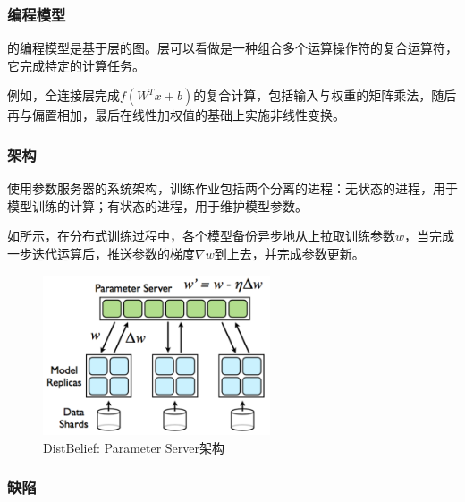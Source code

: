 \subsubsection{编程模型}

\begin{content}

的编程模型是基于层的图。层可以看做是一种组合多个运算操作符的复合运算符，它完成特定的计算任务。

例如，全连接层完成$f({W^T}x + b)$的复合计算，包括输入与权重的矩阵乘法，随后再与偏置相加，最后在线性加权值的基础上实施非线性变换。

\end{content}

\subsubsection{架构}

\begin{content}

使用参数服务器的系统架构，训练作业包括两个分离的进程：无状态的进程，用于模型训练的计算；有状态的进程，用于维护模型参数。

如所示，在分布式训练过程中，各个模型备份异步地从上拉取训练参数$w$，当完成一步迭代运算后，推送参数的梯度$ \nabla w $到上去，并完成参数更新。

\begin{figure}[!htbp]
\centering
\includegraphics[width=0.6\textwidth]{figures/parameter-server.png}
\caption{DistBelief: Parameter Server架构}
 \label{fig:parameter-server}
\end{figure}

\end{content}

\subsubsection{缺陷}

